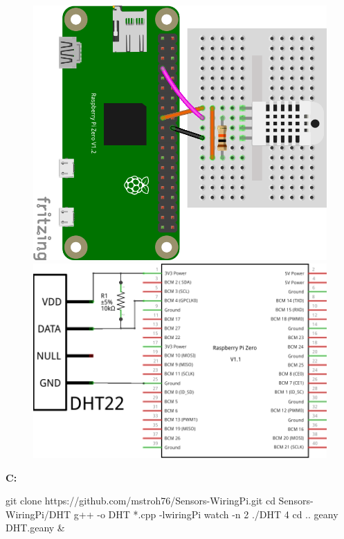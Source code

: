 
\begin{figure}[ht]
  \centering
  \includegraphics[scale=0.24]{images/DHT22_Steckplatine.png}	
  \includegraphics[scale=0.25]{images/DHT22_Schaltplan.png}	
  \label{DHT22_Steckplatine}
\end{figure}




\textbf{C:}

\begin{console}
	git clone https://github.com/mstroh76/Sensors-WiringPi.git
	cd Sensors-WiringPi/DHT
	g++ -o DHT *.cpp -lwiringPi	
	watch -n 2 ./DHT 4
	cd ..
	geany DHT.geany &
\end{console}

